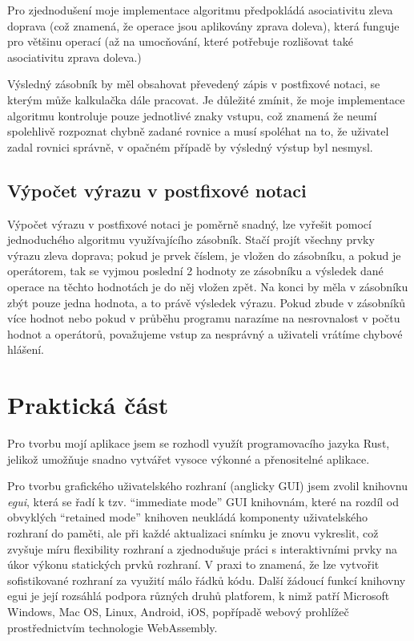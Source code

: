 \documentclass[12pt]{report}
\begin{document}
Pro zjednodušení moje implementace algoritmu předpokládá asociativitu
zleva doprava (což znamená, že operace jsou aplikovány zprava doleva),
která funguje pro většinu operací (až na umocňování, které potřebuje
rozlišovat také asociativitu zprava doleva.)\supercite{enwiki:1222245378}

Výsledný zásobník by měl obsahovat převedený zápis v postfixové notaci,
se kterým může kalkulačka dále pracovat. Je důležité zmínit, že moje
implementace algoritmu kontroluje pouze jednotlivé znaky vstupu, což
znamená že neumí spolehlivě rozpoznat chybně zadané rovnice a musí
spoléhat na to, že uživatel zadal rovnici správně, v opačném případě by
výsledný výstup byl nesmysl.

\section{Výpočet výrazu v postfixové
notaci}

Výpočet výrazu v postfixové notaci je poměrně snadný, lze vyřešit pomocí
jednoduchého algoritmu využívajícího zásobník. Stačí projít všechny
prvky výrazu zleva doprava\supercite{cvut:vyhodnoceni_vyrazu}; pokud je prvek číslem, je vložen do
zásobníku, a pokud je operátorem, tak se vyjmou poslední 2 hodnoty ze
zásobníku a výsledek dané operace na těchto hodnotách je do něj vložen
zpět. Na konci by měla v zásobníku zbýt pouze jedna hodnota, a to právě
výsledek výrazu. Pokud zbude v zásobníků více hodnot nebo pokud v
průběhu programu narazíme na nesrovnalost v počtu hodnot a operátorů,
považujeme vstup za nesprávný a uživateli vrátíme chybové hlášení.\supercite{wiki:postfix}

\chapter{Praktická část}

Pro tvorbu mojí aplikace jsem se rozhodl využít programovacího jazyka
Rust, jelikož umožňuje snadno vytvářet vysoce výkonné a přenositelné
aplikace.

Pro tvorbu grafického uživatelského rozhraní (anglicky GUI) jsem zvolil
knihovnu \emph{egui}, která se řadí k tzv. ``immediate mode'' GUI
knihovnám, které na rozdíl od obvyklých ``retained mode'' knihoven
neukládá komponenty uživatelského rozhraní do paměti, ale při každé
aktualizaci snímku je znovu vykreslit, což zvyšuje míru flexibility
rozhraní a zjednodušuje práci s interaktivními prvky na úkor výkonu
statických prvků rozhraní. V praxi to znamená, že lze vytvořit
sofistikované rozhraní za využití málo řádků kódu. Další žádoucí funkcí
knihovny egui je její rozsáhlá podpora různých druhů platforem, k nimž
patří Microsoft Windows, Mac OS, Linux, Android, iOS, popřípadě webový
prohlížeč prostřednictvím technologie WebAssembly.
\end{document}

